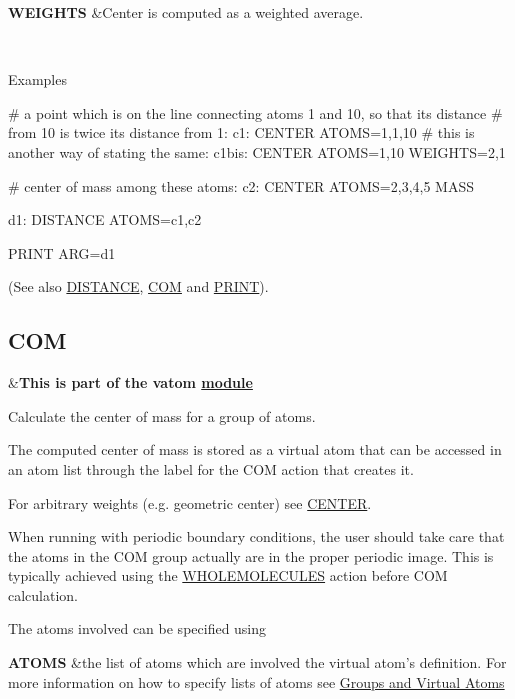 \begin{TabularC}{2}
\hline
{\bfseries  W\+E\+I\+G\+H\+T\+S } &Center is computed as a weighted average.  

\\
\end{TabularC}


\begin{DoxyParagraph}{Examples}

\end{DoxyParagraph}
\begin{DoxyVerb}# a point which is on the line connecting atoms 1 and 10, so that its distance
# from 10 is twice its distance from 1:
c1: CENTER ATOMS=1,1,10
# this is another way of stating the same:
c1bis: CENTER ATOMS=1,10 WEIGHTS=2,1

# center of mass among these atoms:
c2: CENTER ATOMS=2,3,4,5 MASS

d1: DISTANCE ATOMS=c1,c2

PRINT ARG=d1
\end{DoxyVerb}
 (See also \hyperlink{DISTANCE}{D\+I\+S\+T\+A\+N\+C\+E}, \hyperlink{COM}{C\+O\+M} and \hyperlink{PRINT}{P\+R\+I\+N\+T}). \hypertarget{COM}{}\subsection{C\+O\+M}\label{COM}
\begin{TabularC}{2}
\hline
&{\bfseries  This is part of the vatom \hyperlink{mymodules}{module }}   \\
\end{TabularC}
Calculate the center of mass for a group of atoms.

The computed center of mass is stored as a virtual atom that can be accessed in an atom list through the label for the C\+O\+M action that creates it.

For arbitrary weights (e.\+g. geometric center) see \hyperlink{CENTER}{C\+E\+N\+T\+E\+R}.

When running with periodic boundary conditions, the user should take care that the atoms in the C\+O\+M group actually are in the proper periodic image. This is typically achieved using the \hyperlink{WHOLEMOLECULES}{W\+H\+O\+L\+E\+M\+O\+L\+E\+C\+U\+L\+E\+S} action before C\+O\+M calculation.

\begin{DoxyParagraph}{The atoms involved can be specified using}

\end{DoxyParagraph}
\begin{TabularC}{2}
\hline
{\bfseries  A\+T\+O\+M\+S } &the list of atoms which are involved the virtual atom's definition. For more information on how to specify lists of atoms see \hyperlink{Group}{Groups and Virtual Atoms}   \\
\end{TabularC}


